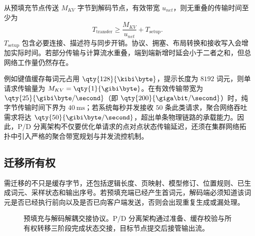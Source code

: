 \documentclass[../textbook.tex]{subfiles}
\begin{document}
\begin{example}[预填充与解码分离的缓存传输代价]
\optional


从预填充节点传送 $M_{KV}$ 字节到解码节点，有效带宽 $u_{net}$，则无重叠的传输时间至少为
\begin{equation*}
 T_{\mathrm{transfer}}\ge\frac{M_{KV}}{u_{net}}+T_{\mathrm{setup}}.
\end{equation*}
$T_{\mathrm{setup}}$ 包含必要连接、描述符与同步开销。协议、拥塞、布局转换和接收写入会增加实际时间。若部分传输与计算流水重叠，端到端新增时延会小于二者之和，但总网络工作量仍然存在。

例如键值缓存每词元占用 $\qty{128}{\kibi\byte}$，提示长度为 $8192$ 词元，则单请求传输量为 $M_{KV}=\qty{1}{\gibi\byte}$。在有效传输带宽为 $\qty{25}{\gibi\byte/\second}$（即 $\qty{200}{\giga\bit/\second}$）时，纯字节传输时间下界为 $\qty{40}{\milli\second}$；若系统每秒并发接收 $50$ 条此类请求，聚合网络吞吐需求将达 $\qty{50}{\gibi\byte/\second}$，超出单条物理链路的承载能力。因此，P/D 分离架构不仅要优化单请求的点对点状态传输延迟，还须在集群网络拓扑中引入严格的聚合带宽规划与并发流控机制。
\end{example}

\subsection{迁移所有权}
需迁移的不只是缓存字节，还包括逻辑长度、页映射、模型修订、位置规则、已生成词元、采样状态和输出序号。若预填充端已经产生首词元，解码端必须知道该词元是否已经执行前向以及是否已向客户端发送，否则会出现重复生成或漏处理。

\begin{figure}[htbp]
\centering
{}
\caption[预填充与解码解耦交接协议]{预填充与解码解耦交接协议。P/D 分离架构通过准备、缓存校验与所有权转移三阶段完成状态交接，目标节点提交后接管输出流。}\label{fig:serving-handoff}
\end{figure}
\end{document}
